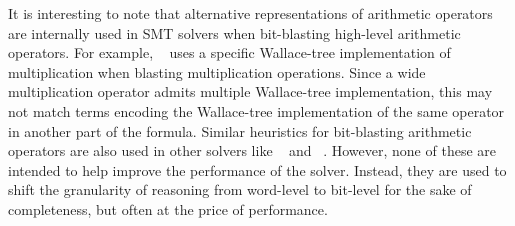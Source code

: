 It is interesting to note that alternative representations of
arithmetic operators are internally used in SMT solvers when
bit-blasting high-level arithmetic operators.  %
For example,
{\zthree}~\cite{zthree} uses a specific Wallace-tree implementation of
multiplication when blasting multiplication operations.  Since a wide
multiplication operator admits multiple Wallace-tree implementation,
this may not match terms encoding the Wallace-tree implementation of
the same operator in another part of the formula.  Similar heuristics
for bit-blasting arithmetic operators are also used in other solvers
like {\boolector}~\cite{boolector} and {\cvcfour}~\cite{cvcfour}.
However, none of these are intended to help improve the performance
of the solver.%
Instead, they are used to shift the granularity of reasoning from
word-level to bit-level for the sake of completeness, but often
at the price of performance.


